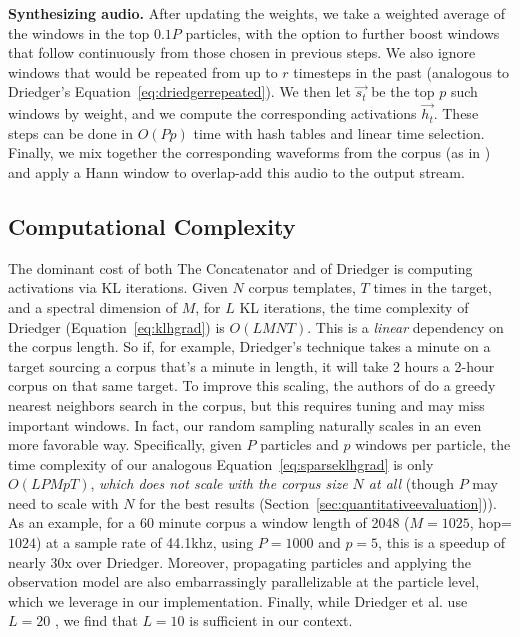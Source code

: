 \documentclass{article}
\begin{document}
\textbf{Synthesizing audio.} After updating the weights, we take a weighted average of the windows in the top $0.1P$ particles, with the option to further boost windows that follow continuously from those chosen in previous steps.  We also ignore windows that would be repeated from up to $r$ timesteps in the past (analogous to Driedger's Equation~\ref{eq:driedgerrepeated}).  We then let $\vec{s_t}$ be the top $p$ such windows by weight, and we compute the corresponding activations $\vec{h_t}$. These steps can be done in $O(Pp)$ time with hash tables and linear time selection.  Finally, we mix together the corresponding waveforms from the corpus (as in \cite{buch2017nichtnegativematrixfaktorisierungnutzendesklangsynthesensystem}) and apply a Hann window to overlap-add this audio to the output stream.


\subsection{Computational Complexity} 
\label{sec:complexity}
The dominant cost of both The Concatenator and of Driedger is computing activations via KL iterations.  Given $N$ corpus templates, $T$ times in the target, and a spectral dimension of $M$, for $L$ KL iterations, the time complexity of Driedger (Equation~\ref{eq:klhgrad}) is $O(LMNT)$.  This is a {\em linear} dependency on the corpus length.  So if, for example, Driedger's technique takes a minute on a target sourcing a corpus that's a minute in length, it will take 2 hours a 2-hour corpus on that same target.  To improve this scaling, the authors of \cite{buch2017nichtnegativematrixfaktorisierungnutzendesklangsynthesensystem} do a greedy nearest neighbors search in the corpus, but this requires tuning and may miss important windows.  In fact, our random sampling naturally scales in an even more favorable way.  Specifically, given $P$ particles and $p$ windows per particle, the time complexity of our analogous Equation~\ref{eq:sparseklhgrad} is only $O(LPMpT)$, {\em which does not scale with the corpus size $N$  at all} (though $P$ may need to scale with $N$ for the best results (Section~\ref{sec:quantitativeevaluation})).  As an example, for a 60 minute corpus a window length of 2048 ($M=1025$, hop=$1024$) at a sample rate of 44.1khz, using $P=1000$ and $p=5$, this is a speedup of nearly 30x over Driedger.  Moreover, propagating particles and applying the observation model are also embarrassingly parallelizable at the particle level, which we leverage in our implementation.  Finally, while Driedger et al. use $L=20$ \cite{driedger2015let}, we find that $L=10$ is sufficient in our context.
\end{document}
